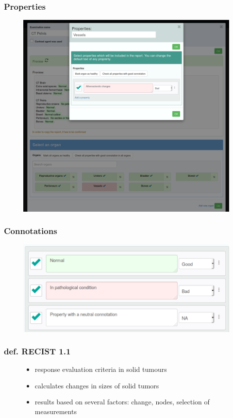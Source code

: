 \documentclass{beamer}
\begin{document}
\begin{frame}
\frametitle{Properties}
\begin{figure}
	\centering
	\includegraphics[width=0.8\linewidth]{../properties-modal}
	\label{fig:properties-list}
\end{figure}
\end{frame}

\begin{frame}
\frametitle{Connotations}
\begin{figure}
	\centering
	\includegraphics[width=1\linewidth]{../property-connotation}
	\label{fig:property-connotation}
\end{figure}
\end{frame}


\begin{frame}
\frametitle{def. RECIST 1.1}
\begin{figure}
\begin{itemize}
	\item response evaluation criteria in solid tumours
	\item calculates changes in sizes of solid tumors
	\item results based on several factors: change, nodes, selection of measurements
	\end{itemize}
\end{figure}
\end{frame}
\end{document}
